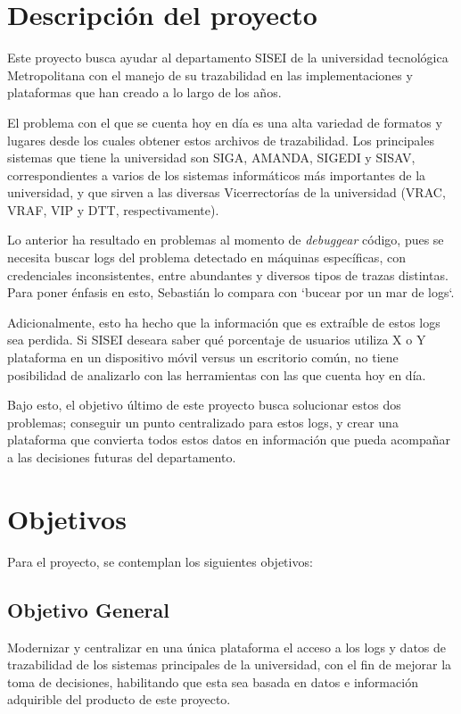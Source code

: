 \section{Descripción del proyecto}

Este proyecto busca ayudar al departamento SISEI de la universidad tecnológica Metropolitana con el manejo de su trazabilidad en las implementaciones y plataformas que han creado a lo largo de los años.

El problema con el que se cuenta hoy en día es una alta variedad de formatos y lugares desde los cuales obtener estos archivos de trazabilidad. Los principales sistemas que tiene la universidad son SIGA, AMANDA, SIGEDI y SISAV, correspondientes a varios de los sistemas informáticos más importantes de la universidad, y que sirven a las diversas Vicerrectorías de la universidad (VRAC, VRAF, VIP y DTT, respectivamente).

Lo anterior ha resultado en problemas al momento de \textit{debuggear} código, pues se necesita buscar logs del problema detectado en máquinas específicas, con credenciales inconsistentes, entre abundantes y diversos tipos de trazas distintas. Para poner énfasis en esto, Sebastián lo compara con `bucear por un mar de logs`.

Adicionalmente, esto ha hecho que la información que es extraíble de estos logs sea perdida. Si SISEI deseara saber qué porcentaje de usuarios utiliza X o Y plataforma en un dispositivo móvil versus un escritorio común, no tiene posibilidad de analizarlo con las herramientas con las que cuenta hoy en día.

Bajo esto, el objetivo último de este proyecto busca solucionar estos dos problemas; conseguir un punto centralizado para estos logs, y crear una plataforma que convierta todos estos datos en información que pueda acompañar a las decisiones futuras del departamento.

\section{Objetivos}

Para el proyecto, se contemplan los siguientes objetivos:

\subsection{Objetivo General}

Modernizar y centralizar en una única plataforma el acceso a los logs y datos de trazabilidad de los sistemas principales de la universidad, con el fin de mejorar la toma de decisiones, habilitando que esta sea basada en datos e información adquirible del producto de este proyecto.

